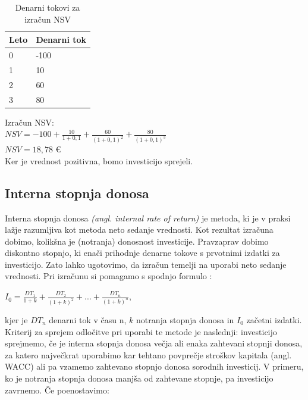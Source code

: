 \begin{table}[ht]
	\caption{Denarni tokovi za izračun NSV}
	\centering
	\begin{tabular}{|L|L|}
	\hline
	\textbf{Leto} & \textbf{Denarni tok} \\
	\hline
	&-100\\
	&10\\
	&60\\
	&80\\
	\hline
	\end{tabular}
\end{table}

Izračun NSV:\\
$NSV = -100 + \tfrac{10}{1+0,1} + \tfrac{60}{(1+0,1)^2} + \tfrac{80}{(1+0,1)^3}$ \\[0,5 cm]
$NSV = 18,78$ €  \\

Ker je vrednost pozitivna, bomo investicijo sprejeli.

\subsection{Interna stopnja donosa}
Interna stopnja donosa \textit{(angl. internal rate of return)} je metoda, ki je v praksi lažje razumljiva kot metoda neto sedanje vrednosti. Kot rezultat izračuna dobimo, kolikšna je (notranja) donosnost investicije. Pravzaprav dobimo diskontno stopnjo, ki enači prihodnje denarne tokove s prvotnimi izdatki za investicijo. Zato lahko ugotovimo, da izračun temelji na uporabi neto sedanje vrednosti. Pri izračunu si pomagamo s spodnjo formulo \cite[str. 156]{Mramor}:\\

\begin{center}
$I_0 = \tfrac{DT_1}{1+k} + \tfrac{DT_2}{(1+k)^2} + ... + \tfrac{DT_n}{(1+k)^n}$,\\
\end{center}

kjer je $DT_n$ denarni tok v času n, $k$ notranja stopnja donosa in $I_0$ začetni izdatki. \\

Kriterij za sprejem odločitve pri uporabi te metode je naslednji: investicijo sprejmemo, če je interna stopnja donosa večja ali enaka zahtevani stopnji donosa, za katero največkrat uporabimo kar tehtano povprečje stroškov kapitala (angl. WACC) ali pa vzamemo zahtevano stopnjo donosa sorodnih investicij. V primeru, ko je notranja stopnja donosa manjša od zahtevane stopnje, pa investicijo zavrnemo. Če poenostavimo:

